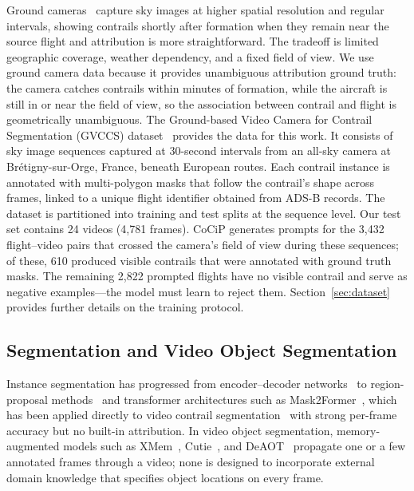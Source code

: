 \documentclass[1p,11pt]{elsarticle}
\begin{document}
Ground cameras~\cite{low2025ground, van2025contrail, jarry2025gvccs} capture sky images at higher spatial resolution and regular intervals, showing contrails shortly after formation when they remain near the source flight and attribution is more straightforward. The tradeoff is limited geographic coverage, weather dependency, and a fixed field of view. We use ground camera data because it provides unambiguous attribution ground truth: the camera catches contrails within minutes of formation, while the aircraft is still in or near the field of view, so the association between contrail and flight is geometrically unambiguous. The Ground-based Video Camera for Contrail Segmentation (GVCCS) dataset~\cite{jarry2025gvccs} provides the data for this work. It consists of sky image sequences captured at 30-second intervals from an all-sky camera at Br\'{e}tigny-sur-Orge, France, beneath European routes. Each contrail instance is annotated with multi-polygon masks that follow the contrail's shape across frames, linked to a unique flight identifier obtained from ADS-B records. The dataset is partitioned into training and test splits at the sequence level. Our test set contains 24 videos (4,781 frames). CoCiP generates prompts for the 3,432 flight--video pairs that crossed the camera's field of view during these sequences; of these, 610 produced visible contrails that were annotated with ground truth masks. The remaining 2,822 prompted flights have no visible contrail and serve as negative examples---the model must learn to reject them. Section~\ref{sec:dataset} provides further details on the training protocol.

\subsection{Segmentation and Video Object Segmentation}

Instance segmentation has progressed from encoder--decoder networks~\cite{ronneberger2015u} to region-proposal methods~\cite{he2017maskrcnn} and transformer architectures such as Mask2Former~\cite{cheng2021maskformer, cheng2021mask2former_video}, which has been applied directly to video contrail segmentation~\cite{jarry2025gvccs} with strong per-frame accuracy but no built-in attribution. In video object segmentation, memory-augmented models such as XMem~\cite{cheng2022xmem}, Cutie~\cite{cheng2024cutie}, and DeAOT~\cite{yang2022deaot} propagate one or a few annotated frames through a video; none is designed to incorporate external domain knowledge that specifies object locations on every frame.
\end{document}
